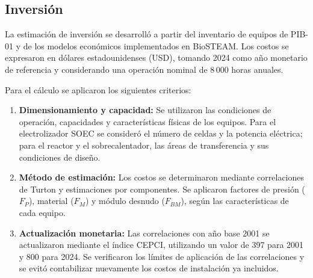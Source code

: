\documentclass[11pt,letterpaper]{article}
\begin{document}
\subsection{Inversión}\label{sec:capex}

La estimación de inversión se desarrolló a partir del
inventario de equipos de PIB-01 y de los modelos
económicos implementados en BioSTEAM. Los costos se
expresaron en dólares estadounidenses (USD), tomando
2024 como año monetario de referencia y considerando
una operación nominal de 8\,000 horas anuales.

Para el cálculo se aplicaron los siguientes criterios:

\begin{enumerate}
    \item \textbf{Dimensionamiento y capacidad:}
    Se utilizaron las condiciones de operación,
    capacidades y características físicas de los
    equipos. Para el electrolizador SOEC se consideró
    el número de celdas y la potencia eléctrica;
    para el reactor y el sobrecalentador, las áreas
    de transferencia y sus condiciones de diseño.

    \item \textbf{Método de estimación:}
    Los costos se determinaron mediante correlaciones
    de Turton y estimaciones por componentes.
    Se aplicaron factores de presión ($F_P$),
    material ($F_M$) y módulo desnudo ($F_{BM}$),
    según las características de cada equipo.

    \item \textbf{Actualización monetaria:}
    Las correlaciones con año base 2001 se
    actualizaron mediante el índice CEPCI,
    utilizando un valor de 397 para 2001 y
    800 para 2024. Se verificaron los límites
    de aplicación de las correlaciones y se
    evitó contabilizar nuevamente los costos
    de instalación ya incluidos.
\end{enumerate}
\end{document}
